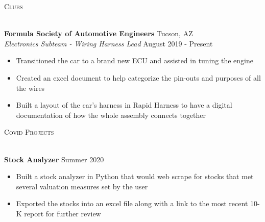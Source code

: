 \documentclass[12pt]{article}
\newcommand{\lineunder} {
    \vspace*{-8pt} \\
    \hspace*{-18pt} \hrulefill \\
}
\newcommand{\header} [1] {
    {\hspace*{-18pt}\vspace*{6pt} \textsc{#1}}
    \vspace*{-6pt} \lineunder
}
\begin{document}
\header{Clubs}
\vspace{1mm}

\textbf{Formula Society of Automotive Engineers} \hfill Tucson, AZ\\
\textit{Electronics Subteam - Wiring Harness Lead} \hfill August 2019 - Present\\
\vspace{-1mm}
\begin{itemize} \itemsep 1pt
	\item Transitioned the car to a brand new ECU and assisted in tuning the engine 
	\item Created an excel document to help categorize  the pin-outs and purposes of all the wires
	\item Built a layout of the car's harness in Rapid Harness to have a digital documentation of how the whole assembly connects together
\end{itemize}



\header{Covid Projects}
\vspace{1mm}

\begin{comment}
\textbf{Evaluation of STEM Degree Value} \hfill Spring 2021\\
\vspace{-2mm}
\begin{itemize} \itemsep 1pt
	\item Using publicly available data, I employed a hypothesis test to assess whether or not STEM majors earn a higher starting salary than Non-STEM majors
	\item Created a scatter plot with a regression line in R to see if there was a correlation between number of hours studying per week and starting median pay for new college graduates
\end{itemize}
\end{comment}

\textbf{Stock Analyzer} \hfill Summer 2020\\
\vspace{-2mm}
\begin{itemize} \itemsep 1pt
	\item Built a stock analyzer in Python that would web scrape for stocks that met several valuation measures set by the user
	\item Exported the stocks into an excel file along with a link to the most recent 10-K report for further review
\end{itemize}
\end{document}
